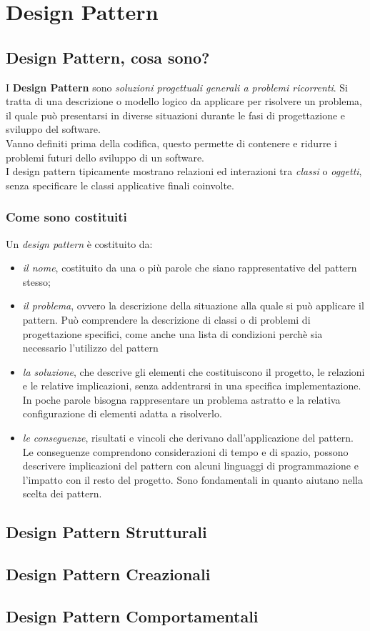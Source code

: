 \chapter{Design Pattern}
\section{Design Pattern, cosa sono?}
I \textbf{Design Pattern} sono \textit{soluzioni progettuali generali a problemi ricorrenti}. Si tratta di una descrizione o modello logico da applicare per risolvere un problema, il quale può presentarsi in diverse situazioni durante le fasi di progettazione e sviluppo del software.\\
Vanno definiti prima della codifica, questo permette di contenere e ridurre i problemi futuri dello sviluppo di un software.\\
I design pattern tipicamente mostrano relazioni ed interazioni tra \textit{classi} o \textit{oggetti}, senza specificare le classi applicative finali coinvolte.

\subsection{Come sono costituiti}
Un \textit{design pattern} è costituito da:
\begin{itemize}
	\item \textit{il nome}, costituito da una o più parole che siano rappresentative del pattern stesso;
	\item \textit{il problema}, ovvero la descrizione della situazione alla quale si può applicare il pattern. Può comprendere la descrizione di classi o di problemi di progettazione specifici, come anche una lista di condizioni perchè sia necessario l'utilizzo del pattern
	\item \textit{la soluzione}, che descrive gli elementi che costituiscono il progetto, le relazioni e le relative implicazioni, senza addentrarsi in una specifica implementazione. In poche parole bisogna rappresentare un problema astratto e la relativa configurazione di elementi adatta a risolverlo.
	\item \textit{le conseguenze}, risultati e vincoli che derivano dall'applicazione del pattern. Le conseguenze comprendono considerazioni di tempo e di spazio, possono descrivere implicazioni del pattern con alcuni linguaggi di programmazione e l'impatto con il resto del progetto. Sono fondamentali in quanto aiutano nella scelta dei pattern.
\end{itemize}

\section{Design Pattern Strutturali}

\section{Design Pattern Creazionali}

\section{Design Pattern Comportamentali}

